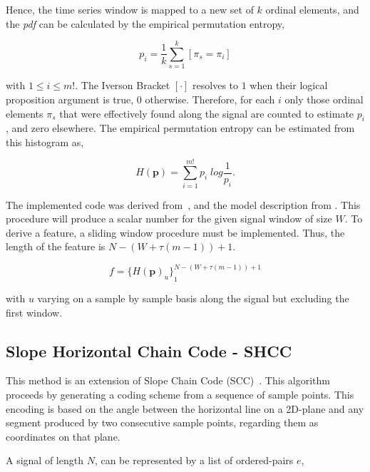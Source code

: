 \documentclass[brainsci,article,submit,moreauthors,pdftex,10pt,a4paper]{mdpi}
\begin{document}
Hence, the time series window is mapped to a new set of $k$ ordinal elements, and the \textit{pdf} can be calculated by the empirical permutation entropy,

\begin{equation}
p_i = \frac{1}{k} \sum_{s=1}^{k} \left[ \pi_{s} = \pi_{i} \right]
\label{eq:pe4}
\end{equation}

\noindent with $1 \leq i \leq m!$. The Iverson Bracket $ \left[ \cdot \right] $ resolves to $1$ when their logical proposition argument is true, $0$ otherwise. Therefore, for each $i$ only those ordinal elements $\pi_{s}$ that were effectively found along the signal are counted to estimate $p_i$, and zero elsewhere.  The empirical permutation entropy can be estimated from this histogram as,

\begin{equation}
H(\textbf{p}) = \sum_{i=1}^{m!} p_{i} \; log \frac{1}{p_{i}}.
\label{eq:pe5}
\end{equation}

The implemented code was derived from~\citep{Unakafova2013}, and the model description from \citep{Berger2017}.  This procedure will produce a scalar number for the given signal window of size $W$.  To derive a feature, a sliding window procedure must be implemented.  Thus, the length of the feature is $N - (W + \tau (m - 1)) + 1$.

\begin{equation}
f =  {\bigg \{ H(\textbf{p})_{u} \bigg \}}_{1}^{N - (W + \tau (m - 1)) + 1}
\label{eq:pe6}
\end{equation}

\noindent with $u$ varying on a sample by sample basis along the signal but excluding the first window.

\subsection{Slope Horizontal Chain Code - SHCC}

This method is an extension of Slope Chain Code (SCC)~\citep{Alvarado-Gonzalez2016}. This algorithm proceeds by generating a coding scheme from a sequence of sample points. This encoding is based on the angle between the horizontal line on a 2D-plane and any segment produced by two consecutive sample points, regarding them as coordinates on that plane.  

A signal of length $N$, can be represented by a list of ordered-pairs $e$,
\end{document}
